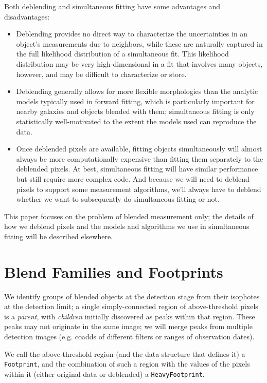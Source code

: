 \documentclass[10pt]{article}
\begin{document}
Both deblending and simultaneous fitting have some advantages and
disadvantages:
\begin{itemize}
\item Deblending provides no direct way to characterize the uncertainties in
      an object's measurements due to neighbors, while these are naturally
      captured in the full likelihood distribution of a simultaneous fit.
      This likelihood distribution may be very high-dimensional in a fit that
      involves many objects, however, and may be difficult to characterize or
      store.
\item Deblending generally allows for more flexible morphologies than the
      analytic models typically used in forward fitting, which is particularly
      important for nearby galaxies and objects blended with them;
      simultaneous fitting is only statistically well-motivated to the extent
      the models used can reproduce the data.
\item Once deblended pixels are available, fitting objects simultaneously will
      almost always be more computationally expensive than fitting them
      separately to the deblended pixels.  At best, simultaneous fitting will
      have similar performance but still require more complex code.  And
      because we will need to deblend pixels to support some measurement
      algorithms, we'll always have to deblend whether we want to subsequently
      do simultaneous fitting or not.
\end{itemize}

This paper focuses on the problem of blended measurement only; the details of
how we deblend pixels and the models and algorithms we use in simultaneous
fitting will be described elsewhere.

\section{Blend Families and Footprints}

We identify groups of blended objects at the detection stage from their
isophotes at the detection limit; a single simply-connected region of
above-threshold pixels is a {\em parent}, with {\em children} initially
discovered as peaks within that region.  These peaks may not originate in
the same image; we will merge peaks from multiple detection images (e.g.
coadds of different filters or ranges of observation dates).

We call the above-threshold region (and the data structure that defines it) a
\texttt{Footprint}, and the combination of such a region with the values of
the pixels within it (either original data or deblended) a \texttt
{HeavyFootprint}.
\end{document}
